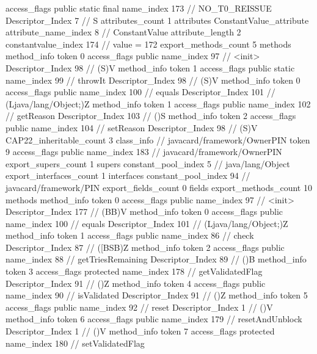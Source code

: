 {{{{{				access_flags	public static final
				name_index	173		// NO_T0_REISSUE
				Descriptor_Index	7		// S
				attributes_count	1
				attributes {
				ConstantValue_attribute {
					attribute_name_index	8		// ConstantValue
					attribute_length	2
					constantvalue_index	174		// value = 172
				}
				}
			}
			}
			export_methods_count	5
			methods {
				method_info {
					token	0
					access_flags	public
					name_index	97		// <init>
					Descriptor_Index	98		// (S)V
				}
				method_info {
					token	1
					access_flags	public static
					name_index	99		// throwIt
					Descriptor_Index	98		// (S)V
				}
				method_info {
					token	0
					access_flags	public
					name_index	100		// equals
					Descriptor_Index	101		// (Ljava/lang/Object;)Z
				}
				method_info {
					token	1
					access_flags	public
					name_index	102		// getReason
					Descriptor_Index	103		// ()S
				}
				method_info {
					token	2
					access_flags	public
					name_index	104		// setReason
					Descriptor_Index	98		// (S)V
				}
			}
			CAP22_inheritable_count	3
		}
		class_info {		// javacard/framework/OwnerPIN
			token	9
			access_flags	public
			name_index	183		// javacard/framework/OwnerPIN
			export_supers_count	1
			supers {
				constant_pool_index	5		// java/lang/Object
			}
			export_interfaces_count	1
			interfaces {
				constant_pool_index	94		// javacard/framework/PIN
			}
			export_fields_count	0
			fields {
			}
			export_methods_count	10
			methods {
				method_info {
					token	0
					access_flags	public
					name_index	97		// <init>
					Descriptor_Index	177		// (BB)V
				}
				method_info {
					token	0
					access_flags	public
					name_index	100		// equals
					Descriptor_Index	101		// (Ljava/lang/Object;)Z
				}
				method_info {
					token	1
					access_flags	public
					name_index	86		// check
					Descriptor_Index	87		// ([BSB)Z
				}
				method_info {
					token	2
					access_flags	public
					name_index	88		// getTriesRemaining
					Descriptor_Index	89		// ()B
				}
				method_info {
					token	3
					access_flags	protected
					name_index	178		// getValidatedFlag
					Descriptor_Index	91		// ()Z
				}
				method_info {
					token	4
					access_flags	public
					name_index	90		// isValidated
					Descriptor_Index	91		// ()Z
				}
				method_info {
					token	5
					access_flags	public
					name_index	92		// reset
					Descriptor_Index	1		// ()V
				}
				method_info {
					token	6
					access_flags	public
					name_index	179		// resetAndUnblock
					Descriptor_Index	1		// ()V
				}
				method_info {
					token	7
					access_flags	protected
					name_index	180		// setValidatedFlag
}}}}}
